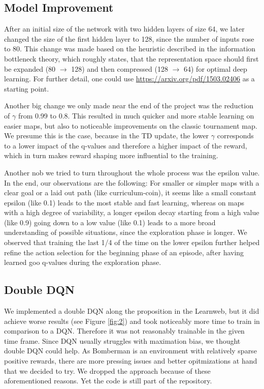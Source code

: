 \documentclass{article} %
\begin{document}
	
	\subsection{Model Improvement}
	After an initial size of the network with two hidden layers of size 64, we later changed the size of the first hidden layer to 128, since the number of inputs rose to 80. This change was made based on the heuristic described in the information bottleneck theory, which roughly states, that the representation space should first be expanded (80 $\rightarrow$ 128) and then compressed (128 $\rightarrow$ 64) for optimal deep learning. For further detail, one could use \url{https://arxiv.org/pdf/1503.02406} as a starting point.
	
	Another big change we only made near the end of the project was the reduction of $\gamma$ from 0.99 to 0.8. This resulted in much quicker and more stable learning on easier maps, but also to noticeable improvements on the classic tournament map. We presume this is the case, because in the TD update, the lower $\gamma$ corresponds to a lower impact of the q-values and therefore a higher impact of the reward, which in turn makes reward shaping more influential to the training.
	
	Another nob we tried to turn throughout the whole process was the epsilon value. In the end, our observations are the following: For smaller or simpler maps with a clear goal or a laid out path (like curriculum-coin), it seems like a small constant epsilon (like 0.1) leads to the most stable and fast learning, whereas on maps with a high degree of variability, a longer epsilon decay starting from a high value (like 0.9) going down to a low value (like 0.1) leads to a more broad understanding of possible situations, since the exploration phase is longer. We observed that training the last 1/4 of the time on the lower epsilon further helped refine the action selection for the beginning phase of an episode, after having learned goo q-values during the exploration phase.
	
	\subsection{Double DQN}
	We implemented a double DQN along the proposition in the Learnweb, but it did achieve worse results (see Figure \ref{fig:2}) and took noticeably more time to train in comparison to a DQN. Therefore it was not reasonably trainable in the given time frame. Since DQN usually struggles with maximation bias, we thought double DQN could help. As Bomberman is an environment with relatively sparse positive rewards, there are more pressing issues and better opitmizations at hand that we decided to try. 
	We dropped the approach because of these aforementioned reasons. Yet the code is still part of the repository.
	
\end{document}
